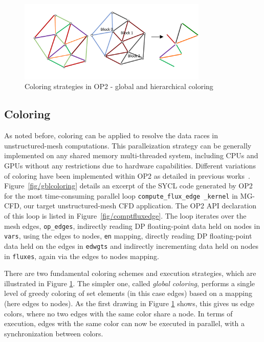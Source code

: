 \documentclass[runningheads]{llncs}
\begin{document}
\begin{figure}[t]\centering
\includegraphics[width=9cm]{figures/coloring}\vspace{-15pt}
\vspace{-5pt}\caption{Coloring strategies in OP2 - global and hierarchical 
coloring}
\label{fig/coloring}\vspace{-15pt}
\end{figure}

\vspace{-10pt}
\subsection{Coloring}\label{subsec/coloring}
\noindent As noted before, coloring can be applied to resolve the data races in 
unstructured-mesh computations. This paralleization strategy can be generally
implemented on any shared memory multi-threaded system, including CPUs and 
GPUs without any restrictions due to hardware capabilities. Different 
variations of coloring have been implemented within OP2 as detailed in  
previous works~\cite{SULYOK201950}. Figure~\ref{fig/gblcoloring} details an 
excerpt of the SYCL code generated by OP2 for the most time-consuming 
parallel loop \texttt{compute\_flux\_edge \_kernel} in MG-CFD, our target 
unstructured-mesh CFD application. The OP2 API declaration of this loop  
is listed in Figure~\ref{fig/comptfluxedge}. The loop iterates over the mesh 
edges, \texttt{op\_edges}, indirectly reading DP floating-point data held on 
nodes in \texttt{vars}, using the edges to nodes, \texttt{en} mapping, 
directly reading DP floating-point data held on the edges in \texttt{edwgts} 
and indirectly incrementing data held on nodes in \texttt{fluxes}, again via 
the edges to nodes mapping.

There are two fundamental coloring schemes and execution strategies, which 
are illustrated in Figure \ref{fig/coloring}. The simpler one, called 
\emph{global coloring}, performs a single level of greedy coloring of set 
elements (in this case edges) based on a mapping (here edges to nodes). As the 
first drawing in Figure \ref{fig/coloring} shows, this gives us edge colors, 
where no two edges with the same color share a node. In terms of execution, 
edges with the same color can now be executed in parallel, with a 
synchronization between colors.
\end{document}
